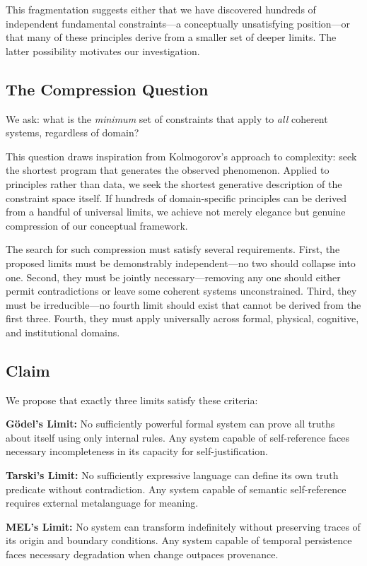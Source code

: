 \documentclass[12pt]{article}
\begin{document}
This fragmentation suggests either that we have discovered hundreds of independent fundamental constraints—a conceptually unsatisfying position—or that many of these principles derive from a smaller set of deeper limits. The latter possibility motivates our investigation.

\subsection{The Compression Question}

We ask: what is the \textit{minimum} set of constraints that apply to \textit{all} coherent systems, regardless of domain?

This question draws inspiration from Kolmogorov's approach to complexity: seek the shortest program that generates the observed phenomenon. Applied to principles rather than data, we seek the shortest generative description of the constraint space itself. If hundreds of domain-specific principles can be derived from a handful of universal limits, we achieve not merely elegance but genuine compression of our conceptual framework.

The search for such compression must satisfy several requirements. First, the proposed limits must be demonstrably independent—no two should collapse into one. Second, they must be jointly necessary—removing any one should either permit contradictions or leave some coherent systems unconstrained. Third, they must be irreducible—no fourth limit should exist that cannot be derived from the first three. Fourth, they must apply universally across formal, physical, cognitive, and institutional domains.

\subsection{Claim}

We propose that exactly three limits satisfy these criteria:

\textbf{Gödel's Limit:} No sufficiently powerful formal system can prove all truths about itself using only internal rules. Any system capable of self-reference faces necessary incompleteness in its capacity for self-justification.

\textbf{Tarski's Limit:} No sufficiently expressive language can define its own truth predicate without contradiction. Any system capable of semantic self-reference requires external metalanguage for meaning.

\textbf{MEL's Limit:} No system can transform indefinitely without preserving traces of its origin and boundary conditions. Any system capable of temporal persistence faces necessary degradation when change outpaces provenance.
\end{document}
